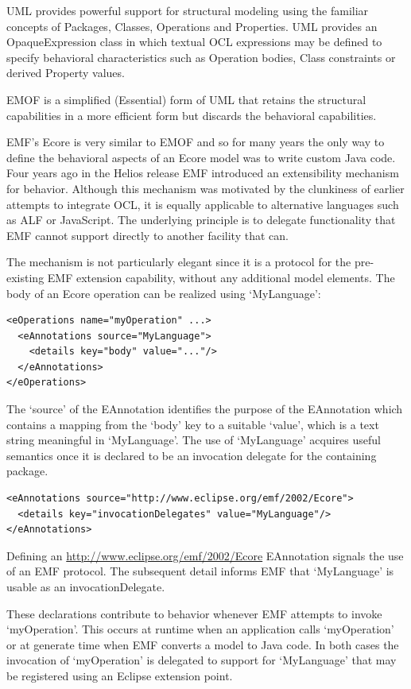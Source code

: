 \documentclass[a4paper]{article}
\begin{document}
UML provides powerful support for structural modeling using the  familiar concepts of Packages, Classes, Operations and Properties. UML provides an OpaqueExpression class in which textual OCL expressions may be defined to specify behavioral characteristics such as Operation bodies, Class constraints or derived Property values.

EMOF is a simplified (Essential) form of UML that retains the structural capabilities in a more efficient form but discards the behavioral capabilities.

EMF's Ecore is very similar to EMOF and so for many years the only way to define the behavioral aspects of an Ecore model was to write custom Java code. Four years ago in the Helios release EMF introduced an extensibility mechanism for behavior. Although this mechanism was motivated by the clunkiness of earlier attempts to integrate OCL, it is equally applicable to alternative languages such as ALF or JavaScript. The underlying principle is to delegate functionality that EMF cannot support directly to another facility that can.

The mechanism is not particularly elegant since it is a protocol for the pre-existing EMF extension capability, without any additional model elements. The body of an Ecore operation can be realized using `MyLanguage':

\begin{verbatim}
<eOperations name="myOperation" ...>
  <eAnnotations source="MyLanguage">
    <details key="body" value="..."/>
  </eAnnotations>
</eOperations>
\end{verbatim}

The `source' of the EAnnotation identifies the purpose of the EAnnotation which contains a mapping from the `body' key to a suitable `value', which is a text string meaningful in `MyLanguage'. The use of `MyLanguage' acquires useful semantics once it is declared to be an invocation delegate for the containing package.

\begin{verbatim}
<eAnnotations source="http://www.eclipse.org/emf/2002/Ecore">
  <details key="invocationDelegates" value="MyLanguage"/>
</eAnnotations>
\end{verbatim}

Defining an  \url{http://www.eclipse.org/emf/2002/Ecore} EAnnotation signals the use of an EMF protocol. The subsequent detail informs EMF that `MyLanguage' is usable as an invocationDelegate.

These declarations contribute to behavior whenever EMF attempts to invoke `myOperation'. This occurs at runtime when an application calls `myOperation' or at generate time when EMF converts a model to Java code. In both cases the invocation of `myOperation' is delegated to support for `MyLanguage' that may be registered using an Eclipse extension point.
\end{document}
